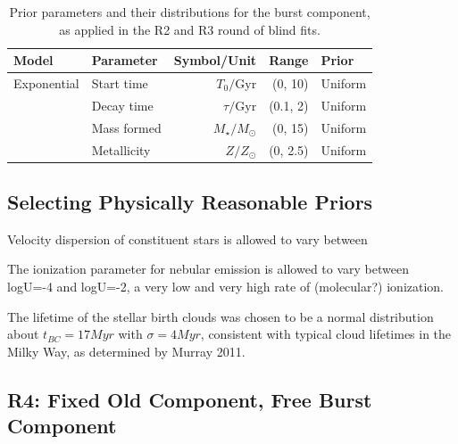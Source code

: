 \documentclass[a4paper,11pt]{article}
\begin{document}
\begin{table}
  \centering
  \begin{tabular}{l l r r l}
    Model       & Parameter   & Symbol/Unit         & Range    & Prior   \\
    \hline \hline
    Exponential & Start time  & $T_0/\mathrm{Gyr}$  & (0, 10)  & Uniform \\ %
                & Decay time  & $\tau/\mathrm{Gyr}$ & (0.1, 2) & Uniform \\
                & Mass formed & $M_\star/M_\odot$   & (0, 15)  & Uniform \\
                & Metallicity & $Z/Z_\odot$         & (0, 2.5) & Uniform \\
  \end{tabular}
  \caption{Prior parameters and their distributions for the burst component, as applied in the R2 and R3 round of blind fits.}
  \label{tab:r2_r3_burst_priors}
\end{table}

\subsection{Selecting Physically Reasonable Priors}\label{sec:prior_selection}

Velocity dispersion of constituent stars is allowed to vary between

The ionization parameter for nebular emission is allowed to vary between logU=-4 and logU=-2, a very low and very high rate of (molecular?) ionization.

The lifetime of the stellar birth clouds was chosen to be a normal distribution about ${t_{BC}=17Myr}$ with ${\sigma=4Myr}$, consistent with typical cloud lifetimes in the Milky Way, as determined by Murray 2011\cite{Murray_2011}.

\subsection{R4: Fixed Old Component, Free Burst Component}\label{sec:r4}
\end{document}
